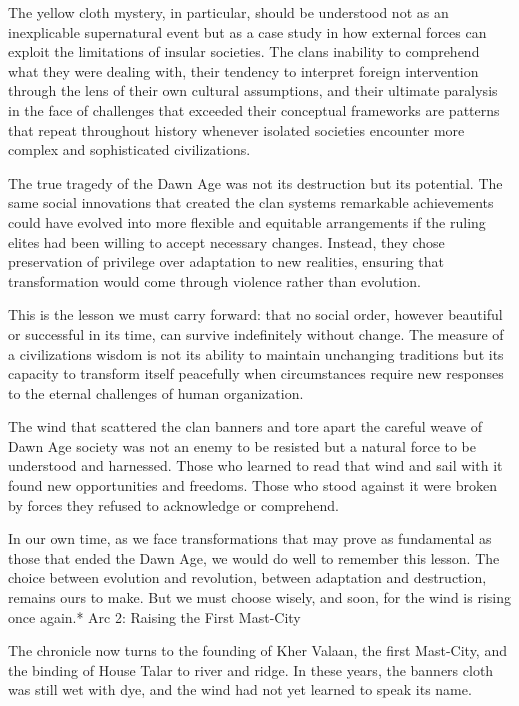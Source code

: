 The yellow cloth mystery, in particular, should be understood not as an
inexplicable supernatural event but as a case study in how external
forces can exploit the limitations of insular societies. The
clans\textquotesingle{} inability to comprehend what they were dealing
with, their tendency to interpret foreign intervention through the lens
of their own cultural assumptions, and their ultimate paralysis in the
face of challenges that exceeded their conceptual frameworks are
patterns that repeat throughout history whenever isolated societies
encounter more complex and sophisticated civilizations.

The true tragedy of the Dawn Age was not its destruction but its
potential. The same social innovations that created the clan
system\textquotesingle s remarkable achievements could have evolved into
more flexible and equitable arrangements if the ruling elites had been
willing to accept necessary changes. Instead, they chose preservation of
privilege over adaptation to new realities, ensuring that transformation
would come through violence rather than evolution.

This is the lesson we must carry forward: that no social order, however
beautiful or successful in its time, can survive indefinitely without
change. The measure of a civilization\textquotesingle s wisdom is not
its ability to maintain unchanging traditions but its capacity to
transform itself peacefully when circumstances require new responses to
the eternal challenges of human organization.

The wind that scattered the clan banners and tore apart the careful
weave of Dawn Age society was not an enemy to be resisted but a natural
force to be understood and harnessed. Those who learned to read that
wind and sail with it found new opportunities and freedoms. Those who
stood against it were broken by forces they refused to acknowledge or
comprehend.

In our own time, as we face transformations that may prove as
fundamental as those that ended the Dawn Age, we would do well to
remember this lesson. The choice between evolution and revolution,
between adaptation and destruction, remains ours to make. But we must
choose wisely, and soon, for the wind is rising once again.* Arc 2:
Raising the First Mast-City

The chronicle now turns to the founding of Kher Valaan, the first
Mast-City, and the binding of House Talar to river and ridge. In these
years, the banner\textquotesingle s cloth was still wet with dye, and
the wind had not yet learned to speak its name.

